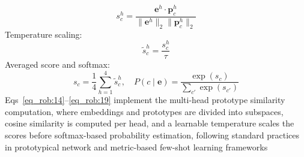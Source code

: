 \documentclass[10pt,letterpaper]{article}
\begin{document}
                                                                                                                 \begin{equation} \label{eq_rob:17}
                                                                                                                 s_c^h = \frac{\mathbf{e}^h \cdot \mathbf{p}_c^h}{\|\mathbf{e}^h\|_2\|\mathbf{p}_c^h\|_2}
                                                                                                                 \end{equation}
                                                                                                                 Temperature scaling:
                                                                                                                 \begin{equation} \label{eq_rob:18}
                                                                                                                 \tilde{s}_c^h = \frac{s_c^h}{\tau}
                                                                                                                 \end{equation}
                                                                                                                 Averaged score and softmax:
                                                                                                                 \begin{equation} \label{eq_rob:19}
                                                                                                                 s_c = \frac{1}{4}\sum_{h=1}^{4}\tilde{s}_c^h,\quad
                                                                                                                 P(c \mid \mathbf{e}) = \frac{\exp(s_c)}{\sum_{c'}\exp(s_{c'})}
                                                                                                                 \end{equation}
                                                                                                                 Eqs~\eqref{eq_rob:14}--\eqref{eq_rob:19} implement the multi-head prototype similarity computation, where embeddings and prototypes are divided into subspaces, cosine similarity is computed per head, and a learnable temperature scales the scores before softmax-based probability estimation, following standard practices in prototypical network and metric-based few-shot learning frameworks~\cite{ref52}
                                                                                                                  
\end{document}

